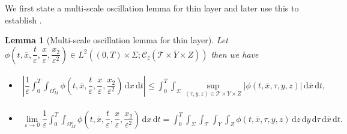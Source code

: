\documentclass[11pt]{article}
\newtheorem{lemma}{Lemma}
\def\es{\varepsilon}
\def\omm{\Omega_M^\varepsilon}
\def\mint{\int_{0}^{T}\int_{\Sigma}\int_{\mathcal{T}}\int_{Y}\int_{Z}}
\def\T{\mathcal{T}}
\newcommand{\di}[1]{\,\mathrm{d}#1}
\begin{document}
We first state a multi-scale oscillation lemma for thin layer and later use this to establish . 
\begin{lemma}[Multi-scale oscillation lemma for thin layer]\label{lemma:oscillation_lemma}
	Let \\$\phi\left(t,\overline{x},\dfrac{t}{\es}, \dfrac{x}{\es},\dfrac{x_2}{\es^2}\right)\in L^2((0,T)\times \Sigma ;\mathcal{C}_{\sharp}(\overline{\T\times Y\times Z}))$ then we have
	\begin{itemize}
	    \item [(i)]\begin{align*}
	       \left| \dfrac{1}{\es}\int_0^T\int_{\omm}\phi\left(t,\overline{x},\dfrac{t}{\es}, \dfrac{x}{\es},\dfrac{x_2}{\es^2}\right)\di{x}\di{t}\right|\leq  \int_0^T\int_{\Sigma}\sup_{(\tau,y,z)\in {\T\times Y\times Z}} |\phi(t,\overline{x},\tau,y,z)| \di{\overline{x}}\di{t},
	    \end{align*}
	    \item[(ii)]
	    \begin{align*}
	        \lim_{\es\rightarrow 0}  \dfrac{1}{\es}\int_0^T\int_{\omm}\phi\left(t,\overline{x},\dfrac{t}{\es}, \dfrac{x}{\es},\dfrac{x_2}{\es^2}\right)\di{x}\di{t}= \mint\phi(t,\overline{x},\tau,y,z) \di{z}\di{y}\di{\tau}\di{\overline{x}}\di{t}.
	    \end{align*}
	\end{itemize}

	\end{lemma}
\end{document}
